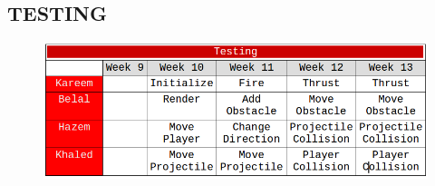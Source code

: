 \documentclass[]{article}
\begin{document}
\subsection{TESTING}

\begin{figure}[H]
\centering
\includegraphics[scale=0.5]{./Test.png}
\end{figure}
\end{document}
